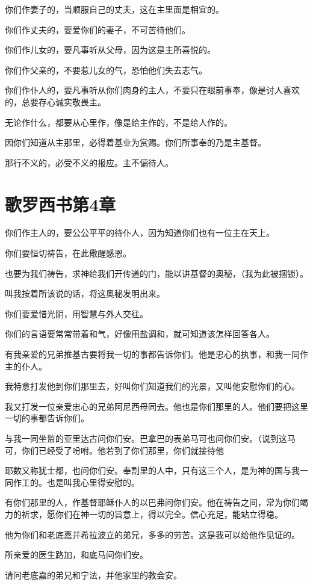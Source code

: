 \documentclass[12pt,oneside]{book}
\begin{document}
你们作妻子的，当顺服自己的丈夫，这在主里面是相宜的。

你们作丈夫的，要爱你们的妻子，不可苦待他们。

你们作儿女的，要凡事听从父母，因为这是主所喜悦的。

你们作父亲的，不要惹儿女的气，恐怕他们失去志气。

你们作仆人的，要凡事听从你们肉身的主人，不要只在眼前事奉，像是讨人喜欢的，总要存心诚实敬畏主。

无论作什么，都要从心里作，像是给主作的，不是给人作的。

因你们知道从主那里，必得着基业为赏赐。你们所事奉的乃是主基督。

那行不义的，必受不义的报应。主不偏待人。

\chapter{歌罗西书第4章}
你们作主人的，要公公平平的待仆人，因为知道你们也有一位主在天上。

你们要恒切祷告，在此儆醒感恩。

也要为我们祷告，求神给我们开传道的门，能以讲基督的奥秘，（我为此被捆锁）。

叫我按着所该说的话，将这奥秘发明出来。

你们要爱惜光阴，用智慧与外人交往。

你们的言语要常常带着和气，好像用盐调和，就可知道该怎样回答各人。

有我亲爱的兄弟推基古要将我一切的事都告诉你们。他是忠心的执事，和我一同作主的仆人。

我特意打发他到你们那里去，好叫你们知道我们的光景，又叫他安慰你们的心。

我又打发一位亲爱忠心的兄弟阿尼西母同去。他也是你们那里的人。他们要把这里一切的事都告诉你们。

与我一同坐监的亚里达古问你们安。巴拿巴的表弟马可也问你们安。（说到这马可，你们已经受了吩咐。他若到了你们那里，你们就接待他

耶数又称犹士都，也问你们安。奉割里的人中，只有这三个人，是为神的国与我一同作工的。也是叫我心里得安慰的。

有你们那里的人，作基督耶稣仆人的以巴弗问你们安。他在祷告之间，常为你们竭力的祈求，愿你们在神一切的旨意上，得以完全。信心充足，能站立得稳。

他为你们和老底嘉并希拉波立的弟兄，多多的劳苦。这是我可以给他作见证的。

所亲爱的医生路加，和底马问你们安。

请问老底嘉的弟兄和宁法，并他家里的教会安。
\end{document}
